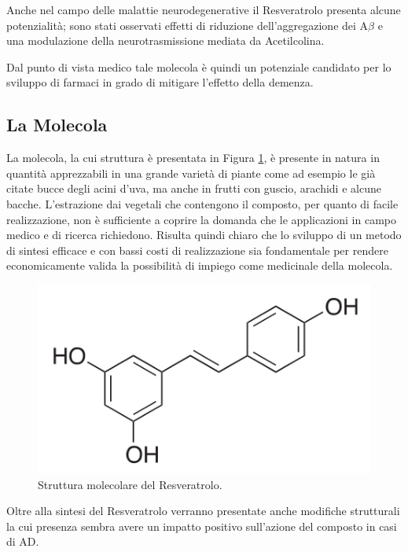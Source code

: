 \documentclass[a4paper, 12pt]{article}
\begin{document}
Anche nel campo delle malattie neurodegenerative il Resveratrolo presenta alcune potenzialità; sono stati osservati effetti di riduzione dell'aggregazione dei A\(\beta\) e una modulazione della neurotrasmissione mediata da Acetilcolina.

Dal punto di vista medico tale molecola è quindi un potenziale candidato per lo sviluppo di farmaci in grado di mitigare l'effetto della demenza. \autocite{jabir_cholinesterase_2018}

\subsection{La Molecola}
La molecola, la cui struttura è presentata in Figura \ref{fig:resveratrolo}, è presente in natura in quantità apprezzabili in una grande varietà di piante come ad esempio le già citate bucce degli acini d'uva, ma anche in frutti con guscio, arachidi e alcune bacche. L'estrazione dai vegetali che contengono il composto, per quanto di facile realizzazione, non è sufficiente a coprire la domanda che le applicazioni in campo medico e di ricerca richiedono. Risulta quindi chiaro che lo sviluppo di un metodo di sintesi efficace e con bassi costi di realizzazione sia fondamentale per rendere economicamente valida la possibilità di impiego come medicinale della molecola.
\begin{figure}[H]
	\centering
	\includegraphics[width=.5\linewidth]{immagini/resveratrolo.png}
	\caption{Struttura molecolare del Resveratrolo.}
	\label{fig:resveratrolo}
\end{figure}
Oltre alla sintesi del Resveratrolo verranno presentate anche modifiche strutturali la cui presenza sembra avere un impatto positivo sull'azione del composto in casi di AD.
\end{document}
